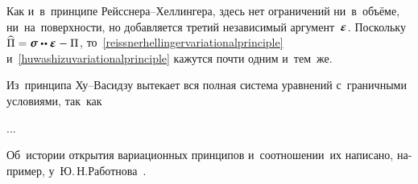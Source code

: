 \begin{otherlanguage}{russian}
Как и~в~принципе Рейсснера\hbox{--}Хеллингера, здесь нет ограничений ни~в~объёме, ни~на~поверхности, но добавляется третий независимый аргумент~$\mathboldepsilon$. Поскольку ${\widehat{\Pi} = \linearstress \dotdotp \mathboldepsilon - \Pi}$, то~\eqref{reissnerhellingervariationalprinciple} и~\eqref{huwashizuvariationalprinciple} кажутся почти одним и~тем~же.

Из~принципа Ху\hbox{--}Васидзу вытекает вся полная система уравнений с~граничными условиями, так~как

...


Об~истории открытия вариационных принципов и~соотношении~их написано, например, у~Ю.\,Н.\;Работнова~\cite{rabotnov-mechanicsofdeformable}.

\end{otherlanguage}



